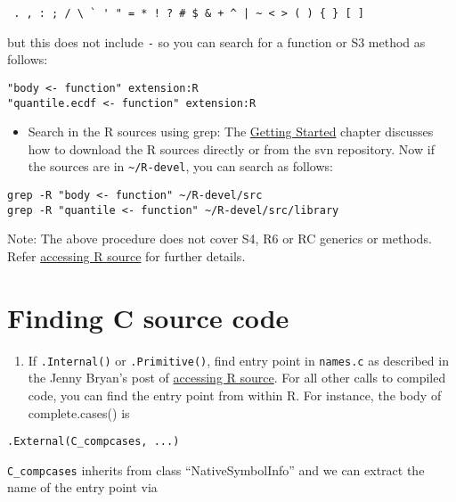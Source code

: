 \documentclass[
  letterpaper,
  DIV=11,
  numbers=noendperiod]{scrreprt}
\providecommand{\tightlist}{%
  \setlength{\itemsep}{0pt}\setlength{\parskip}{0pt}}\usepackage{longtable,booktabs,array}
\begin{document}
\begin{verbatim}
 . , : ; / \ ` ' " = * ! ? # $ & + ^ | ~ < > ( ) { } [ ]
\end{verbatim}

but this does not include \texttt{-} so you can search for a function or
S3 method as follows:

\begin{verbatim}
"body <- function" extension:R
"quantile.ecdf <- function" extension:R
\end{verbatim}

\begin{itemize}
\tightlist
\item
  Search in the R sources using grep: The \hyperref[GetStart]{Getting
  Started} chapter discusses how to download the R sources directly or
  from the svn repository. Now if the sources are in
  \texttt{\textasciitilde{}/R-devel}, you can search as follows:
\end{itemize}

\begin{verbatim}
grep -R "body <- function" ~/R-devel/src
grep -R "quantile <- function" ~/R-devel/src/library
\end{verbatim}

Note: The above procedure does not cover S4, R6 or RC generics or
methods. Refer
\href{https://github.com/jennybc/access-r-source}{accessing R source}
for further details.

\section{Finding C source code}\label{finding-c-source-code}

\begin{enumerate}
\def\labelenumi{\arabic{enumi}.}
\tightlist
\item
  If \texttt{.Internal()} or \texttt{.Primitive()}, find entry point in
  \texttt{names.c} as described in the Jenny Bryan's post of
  \href{https://github.com/jennybc/access-r-source}{accessing R source}.
  For all other calls to compiled code, you can find the entry point
  from within R. For instance, the body of complete.cases() is
\end{enumerate}

\begin{verbatim}
.External(C_compcases, ...)
\end{verbatim}

\texttt{C\_compcases} inherits from class ``NativeSymbolInfo'' and we
can extract the name of the entry point via
\end{document}
